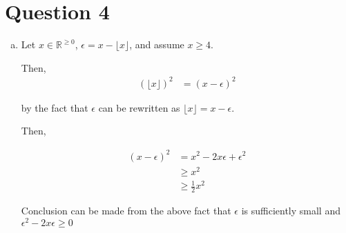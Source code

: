 \documentclass[12pt]{article}
\begin{document}
\section*{Question 4}

    \begin{enumerate}[a.]
        \item

        Let $x \in \mathbb{R}^{\geq 0}$, $\epsilon = x - \lfloor x \rfloor$, and
        assume $x \geq 4$.

        \bigskip

        Then,
        \setcounter{equation}{0}
        \begin{align}
            (\lfloor x \rfloor)^2 &= (x - \epsilon)^2
        \end{align}

        \bigskip

        by the fact that $\epsilon$ can be rewritten as $\lfloor x \rfloor = x - \epsilon$.

        \bigskip

        Then,

        \begin{align}
            (x - \epsilon)^2 &= x^2 - 2x\epsilon + \epsilon^2\\
            &\geq x^2\\
            &\geq \frac{1}{2}x^2
        \end{align}

        \bigskip

        Conclusion can be made from the above fact that $\epsilon$ is sufficiently
        small and $\epsilon^2 - 2x\epsilon \geq 0$

    \end{enumerate}
\end{document}
